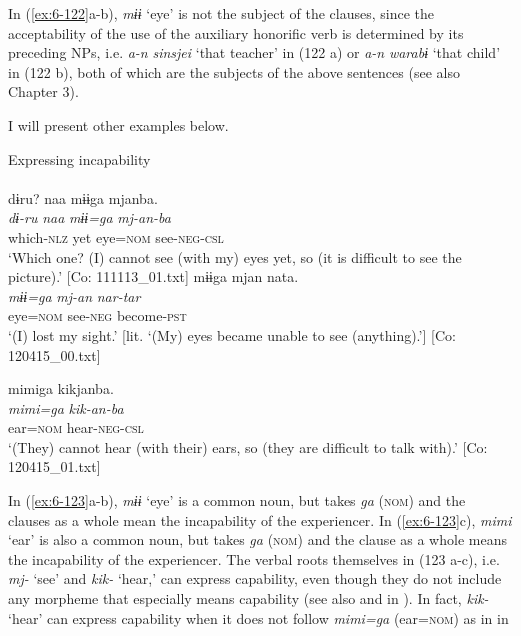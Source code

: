 \begin{styleBeschriftung}
In (\ref{ex:6-122}a-b), \textit{mɨɨ} ‘eye’ is not the subject of the clauses, since the acceptability of the use of the auxiliary honorific verb is determined by its preceding NPs, i.e. \textit{a-n} \textit{sinsjei} ‘that teacher’ in (122 a) or \textit{a-n} \textit{warabɨ} ‘that child’ in (122 b), both of which are the subjects of the above sentences (see also Chapter 3).

  I will present other examples below.

\ea\label{ex:6-123}
 Expressing incapability\\
\ea  [= (\ref{ex:5-36}a)]\\

{\TM}
\glll dɨru?  naa  mɨɨga  mjanba.\\
      \textit{dɨ-ru}  \textit{naa}  \textit{mɨɨ=ga}  \textit{mj-an-ba}\\
      which-\textsc{nlz}  yet  eye=\textsc{nom}  see-\textsc{neg}-\textsc{csl}\\
\glt ‘Which one? (I) cannot see (with my) eyes yet, so (it is difficult to see the picture).’ [Co: 111113\_01.txt]
\ex
{\TM}
\gll mɨɨga  mjan  nata.\\
      \textit{mɨɨ=ga}  \textit{mj-an}  \textit{nar-tar}\\
      eye=\textsc{nom}  see-\textsc{neg}  become-\textsc{pst}\\
\glt ‘(I) lost my sight.’ [lit. ‘(My) eyes became unable to see (anything).’]      [Co: 120415\_00.txt]

\ex
{\TM}
\gll mimiga  kikjanba.\\
\glll \textit{mimi=ga}  \textit{kik-an-ba}\\
ear=\textsc{nom}  hear-\textsc{neg}-\textsc{csl}\\
\glt ‘(They) cannot hear (with their) ears, so (they are difficult to talk with).’ [Co: 120415\_01.txt]
\z
\z

In (\ref{ex:6-123}a-b), \textit{mɨɨ} ‘eye’ is a common noun, but takes \textit{ga} (\textsc{nom}) and the clauses as a whole mean the incapability of the experiencer. In (\ref{ex:6-123}c), \textit{mimi} ‘ear’ is also a common noun, but takes \textit{ga} (\textsc{nom}) and the clause as a whole means the incapability of the experiencer. The verbal roots themselves in (123 a-c), i.e. \textit{mj-} ‘see’ and \textit{kik-} ‘hear,’ can express capability, even though they do not include any morpheme that especially means capability (see also  and  in ). In fact, \textit{kik-} ‘hear’ can express capability when it does not follow \textit{mimi=ga} (ear=\textsc{nom}) as in  in 


\end{styleBeschriftung}
